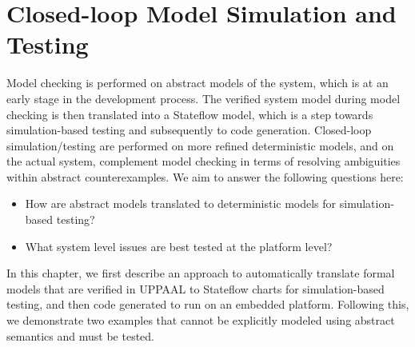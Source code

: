 \chapter{Closed-loop Model Simulation and Testing}
Model checking is performed on abstract models of the system, which is at an early stage in the development process. The verified system model during model checking is then translated into a Stateflow model, which is a step towards simulation-based testing and subsequently to code generation. Closed-loop simulation/testing are performed on more refined deterministic models, and on the actual system, complement model checking in terms of resolving ambiguities within abstract counterexamples. We aim to answer the following questions here:

\begin{itemize}
	\vspace{-5pt}
	\item How are abstract models translated to deterministic models for simulation-based testing?
	\vspace{-5pt}
	\item What system level issues are best tested at the platform level?
\end{itemize}

In this chapter, we first describe an approach to automatically translate formal models that are verified in UPPAAL to Stateflow charts for simulation-based testing, and then code generated to run on an embedded platform. Following this, we demonstrate two examples that cannot be explicitly modeled using abstract semantics and must be tested.

